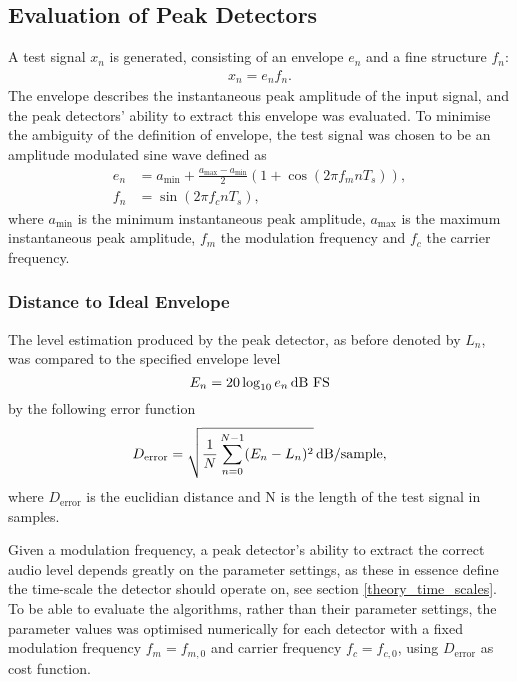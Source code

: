 \documentclass[../main2.tex]{subfiles}
\begin{document}
\subsection{Evaluation of Peak Detectors}\label{method_peak_detectors}
A test signal $x_n$ is generated, consisting of an envelope $e_n$ and a fine structure $f_n$:
\begin{align}
x_n = e_n f_n.
\end{align}
The envelope describes the instantaneous peak amplitude of the input signal, and the peak detectors' ability to extract this envelope was evaluated. To minimise the ambiguity of the definition of envelope, the test signal was chosen to be an amplitude modulated sine wave defined as
\begin{equation}
\begin{split}
	e_n &= a_\text{min} + \frac{a_\text{max}- a_\text{min}}{2} \left(1 + \cos(2 \pi f_m n T_s) \right), \\
	f_n &= \sin(2 \pi f_c n T_s),
\end{split} \label{eq:test_signal}
\end{equation}
where $a_\text{min}$ is the minimum instantaneous peak amplitude, $a_\text{max}$ is the maximum instantaneous peak amplitude, $f_m$ the modulation frequency and $f_c$ the carrier frequency.

\subsubsection{Distance to Ideal Envelope}
The level estimation produced by the peak detector, as before denoted by $L_n$, was compared to the specified envelope level
\begin{equation}
E_n = 20 \log_{10} e_n \mskip3mu\text{dB FS}
\end{equation}
by the following error function
\begin{equation}
D_\text{error} = \sqrt{ \frac{1}{N}\sum_{n = 0}^{N-1} (E_n - L_n)^2 } \mskip3mu\text{dB} / \text{sample},
\end{equation}
where $D_\text{error}$ is the euclidian distance and N is the length of the test signal in samples. 

Given a modulation frequency, a peak detector's ability to extract the correct audio level depends greatly on the parameter settings, as these in essence define the time-scale the detector should operate on, see section \ref{theory_time_scales}. To be able to evaluate the algorithms, rather than their parameter settings, the parameter values was optimised numerically for each detector with a fixed modulation frequency $f_m = f_{m,0}$ and carrier frequency $f_c = f_{c,0}$, using $D_\text{error}$ as cost function.
\end{document}
